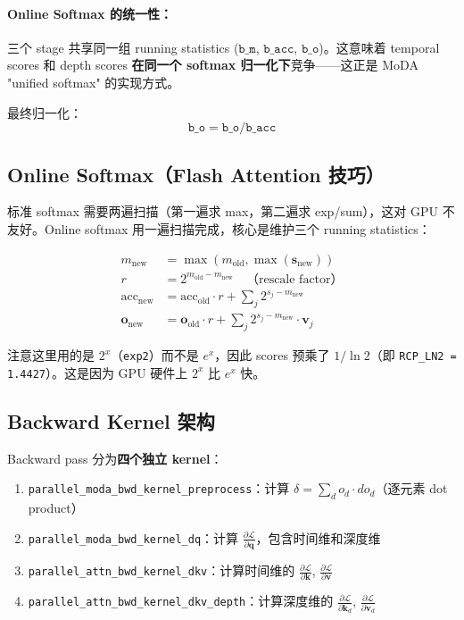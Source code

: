 \documentclass[11pt,a4paper]{article}
\begin{document}
\paragraph{Online Softmax 的统一性：}
三个 stage 共享同一组 running statistics ($\texttt{b\_m}$, $\texttt{b\_acc}$, $\texttt{b\_o}$)。这意味着 temporal scores 和 depth scores \textbf{在同一个 softmax 归一化下}竞争——这正是 MoDA "unified softmax" 的实现方式。

最终归一化：
\begin{equation}
  \texttt{b\_o} = \texttt{b\_o} / \texttt{b\_acc}
\end{equation}

\subsection{Online Softmax（Flash Attention 技巧）}

标准 softmax 需要两遍扫描（第一遍求 max，第二遍求 exp/sum），这对 GPU 不友好。Online softmax 用一遍扫描完成，核心是维护三个 running statistics：

\begin{align}
  m_{\text{new}} &= \max(m_{\text{old}}, \max(\mathbf{s}_{\text{new}})) \label{eq:online_m} \\
  r &= 2^{m_{\text{old}} - m_{\text{new}}} \quad \text{（rescale factor）} \label{eq:online_r} \\
  \text{acc}_{\text{new}} &= \text{acc}_{\text{old}} \cdot r + \sum_j 2^{s_j - m_{\text{new}}} \label{eq:online_acc} \\
  \mathbf{o}_{\text{new}} &= \mathbf{o}_{\text{old}} \cdot r + \sum_j 2^{s_j - m_{\text{new}}} \cdot \mathbf{v}_j \label{eq:online_o}
\end{align}

注意这里用的是 $2^x$（\texttt{exp2}）而不是 $e^x$，因此 scores 预乘了 $1/\ln 2$（即 \texttt{RCP\_LN2 = 1.4427}）。这是因为 GPU 硬件上 $2^x$ 比 $e^x$ 快。

\subsection{Backward Kernel 架构}

Backward pass 分为\textbf{四个独立 kernel}：

\begin{enumerate}
  \item \texttt{parallel\_moda\_bwd\_kernel\_preprocess}：计算 $\delta = \sum_d o_d \cdot do_d$（逐元素 dot product）
  \item \texttt{parallel\_moda\_bwd\_kernel\_dq}：计算 $\frac{\partial \mathcal{L}}{\partial \mathbf{q}}$，包含时间维和深度维
  \item \texttt{parallel\_attn\_bwd\_kernel\_dkv}：计算时间维的 $\frac{\partial \mathcal{L}}{\partial \mathbf{k}}$, $\frac{\partial \mathcal{L}}{\partial \mathbf{v}}$
  \item \texttt{parallel\_attn\_bwd\_kernel\_dkv\_depth}：计算深度维的 $\frac{\partial \mathcal{L}}{\partial \mathbf{k}_d}$, $\frac{\partial \mathcal{L}}{\partial \mathbf{v}_d}$
\end{enumerate}
\end{document}
